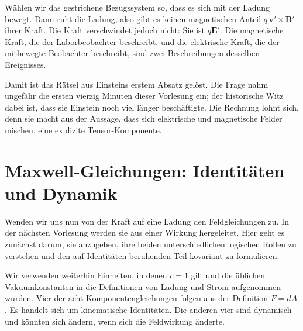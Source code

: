 Wählen wir das gestrichene Bezugssystem so, dass es sich mit der Ladung bewegt. Dann ruht die Ladung, also gibt es keinen magnetischen Anteil \(q\,\mathbf v'\times\mathbf B'\) ihrer Kraft. Die Kraft verschwindet jedoch nicht: Sie ist \(q\mathbf E'\). Die magnetische Kraft, die der Laborbeobachter beschreibt, und die elektrische Kraft, die der mitbewegte Beobachter beschreibt, sind zwei Beschreibungen desselben Ereignisses.

Damit ist das Rätsel aus Einsteins erstem Absatz gelöst. Die Frage nahm ungefähr die ersten vierzig Minuten dieser Vorlesung ein; der historische Witz dabei ist, dass sie Einstein noch viel länger beschäftigte. Die Rechnung lohnt sich, denn sie macht aus der Aussage, dass sich elektrische und magnetische Felder mischen, eine explizite Tensor-Komponente.

\section{Maxwell-Gleichungen: Identitäten und Dynamik}

Wenden wir uns nun von der Kraft auf eine Ladung den Feldgleichungen zu. In der nächsten Vorlesung werden sie aus einer Wirkung hergeleitet. Hier geht es zunächst darum, sie anzugeben, ihre beiden unterschiedlichen logischen Rollen zu verstehen und den auf Identitäten beruhenden Teil kovariant zu formulieren.

\begin{classroomqa}\end{classroomqa}

\begin{classroomqa}\end{classroomqa}

Wir verwenden weiterhin Einheiten, in denen \(c=1\) gilt und die üblichen Vakuumkonstanten in die Definitionen von Ladung und Strom aufgenommen wurden. Vier der acht Komponentengleichungen folgen aus der Definition \(F=dA\). Es handelt sich um kinematische Identitäten. Die anderen vier sind dynamisch und könnten sich ändern, wenn sich die Feldwirkung änderte.

